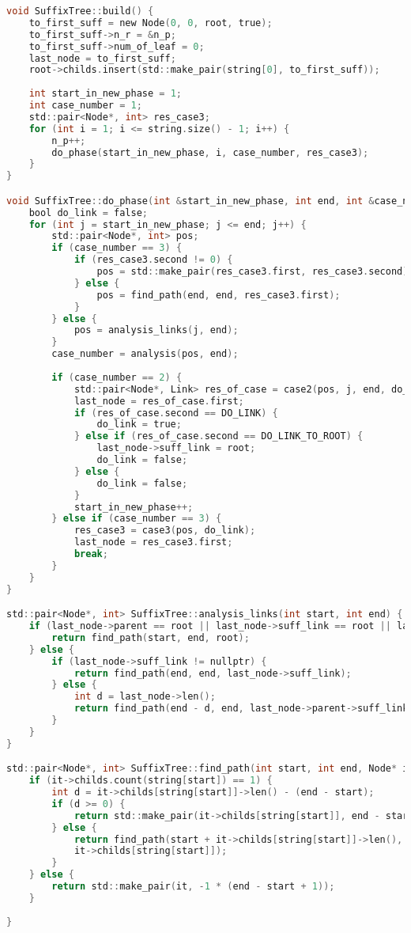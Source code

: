\begin{lstlisting}[language=C]
void SuffixTree::build() {
	to_first_suff = new Node(0, 0, root, true);
	to_first_suff->n_r = &n_p;
	to_first_suff->num_of_leaf = 0;
	last_node = to_first_suff;
	root->childs.insert(std::make_pair(string[0], to_first_suff));
	
	int start_in_new_phase = 1;
	int case_number = 1;
	std::pair<Node*, int> res_case3;
	for (int i = 1; i <= string.size() - 1; i++) {
		n_p++;
		do_phase(start_in_new_phase, i, case_number, res_case3);
	}
}

void SuffixTree::do_phase(int &start_in_new_phase, int end, int &case_number, std::pair<Node*, int> &res_case3) {
	bool do_link = false;
	for (int j = start_in_new_phase; j <= end; j++) {
		std::pair<Node*, int> pos;
		if (case_number == 3) {
			if (res_case3.second != 0) {
				pos = std::make_pair(res_case3.first, res_case3.second);
			} else {
				pos = find_path(end, end, res_case3.first);
			}
		} else {
			pos = analysis_links(j, end);
		}
		case_number = analysis(pos, end);
		
		if (case_number == 2) {
			std::pair<Node*, Link> res_of_case = case2(pos, j, end, do_link);
			last_node = res_of_case.first;
			if (res_of_case.second == DO_LINK) {
				do_link = true;
			} else if (res_of_case.second == DO_LINK_TO_ROOT) {
				last_node->suff_link = root;
				do_link = false;
			} else {
				do_link = false;
			}
			start_in_new_phase++;
		} else if (case_number == 3) {
			res_case3 = case3(pos, do_link);
			last_node = res_case3.first;
			break;
		}
	}
}

std::pair<Node*, int> SuffixTree::analysis_links(int start, int end) {
	if (last_node->parent == root || last_node->suff_link == root || last_node == root) {
		return find_path(start, end, root);
	} else {
		if (last_node->suff_link != nullptr) {
			return find_path(end, end, last_node->suff_link);
		} else {
			int d = last_node->len();
			return find_path(end - d, end, last_node->parent->suff_link);
		}
	}
}

std::pair<Node*, int> SuffixTree::find_path(int start, int end, Node* it) {
	if (it->childs.count(string[start]) == 1) {
		int d = it->childs[string[start]]->len() - (end - start);
		if (d >= 0) {
			return std::make_pair(it->childs[string[start]], end - start);
		} else {
			return find_path(start + it->childs[string[start]]->len(), end,
			it->childs[string[start]]);
		}
	} else {
		return std::make_pair(it, -1 * (end - start + 1));
	}
	
}


\end{lstlisting}
